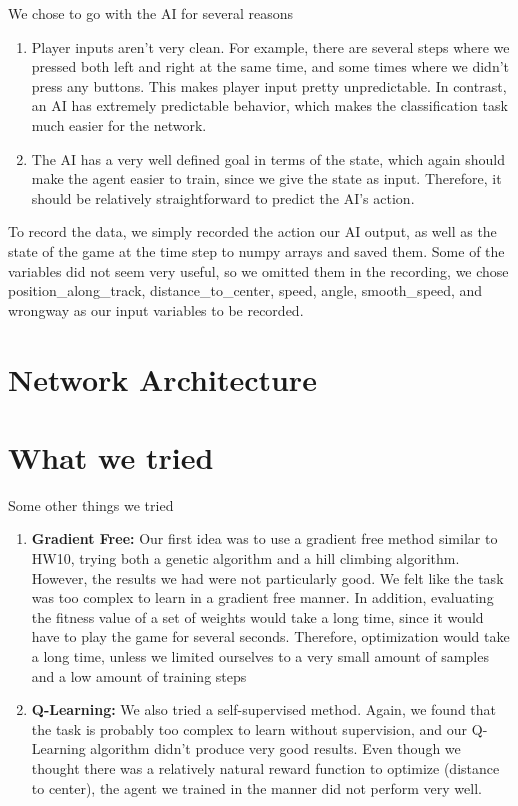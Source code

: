 \documentclass[psamsfonts]{amsart}
\theoremstyle{definition}
\theoremstyle{remark}
\begin{document}
 We chose to go with the AI for several reasons
\begin{enumerate}
\item Player inputs aren't very clean. For example, there are several steps where we pressed both left and right at the same time, and some times where we didn't press any buttons. This makes player input pretty unpredictable. In contrast, an AI has extremely predictable behavior, which makes the classification task much easier for the network.
\item The AI has a very well defined goal in terms of the state, which again should make the agent easier to train, since we give the state as input. Therefore, it should be relatively straightforward to predict the AI's action.
\end{enumerate}

To record the data, we simply recorded the action our AI output, as well as the state of the game at the time step to numpy arrays and saved them. Some of the variables did not seem very useful, so we omitted them in the recording, we chose position\_along\_track, distance\_to\_center, speed, angle, smooth\_speed, and wrongway as our input variables to be recorded.

\section*{Network Architecture}

\section*{What we tried}
Some other things we tried
\begin{enumerate}
\item \textbf{Gradient Free: }Our first idea was to use a gradient free method similar to HW10, trying both a genetic algorithm and a hill climbing algorithm. However, the results we had were not particularly good. We felt like the task was too complex to learn in a gradient free manner. In addition, evaluating the fitness value of a set of weights would take a long time, since it would have to play the game for several seconds. Therefore, optimization would take a long time, unless we limited ourselves to a very small amount of samples and a low amount of training steps
\item \textbf{Q-Learning: } We also tried a self-supervised method. Again, we found that the task is probably too complex to learn without supervision, and our Q-Learning algorithm didn't produce very good results. Even though we thought there was a relatively natural reward function to optimize (distance to center), the agent we trained in the manner did not perform very well. 
\end{enumerate}
\end{document}
